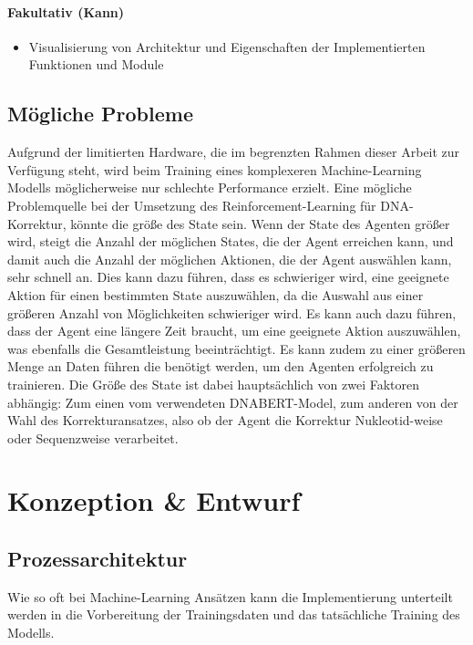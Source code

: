 \documentclass[oneside,bibliography=totocnumbered,BCOR=5mm]{scrbook}%
\theoremstyle{definition}
\theoremstyle{definition}
\theoremstyle{definition}
\theoremstyle{definition}
\theoremstyle{definition}
\theoremstyle{definition}
\begin{document}
\subsubsection{Fakultativ (Kann)}
\begin{itemize}
  \item Visualisierung von Architektur und Eigenschaften der Implementierten Funktionen und Module
  \end{itemize}

\section{Mögliche Probleme}
Aufgrund der limitierten Hardware, die im begrenzten Rahmen dieser Arbeit zur Verfügung steht,
wird beim Training eines komplexeren Machine-Learning Modells möglicherweise nur schlechte Performance erzielt.
Eine mögliche Problemquelle bei der Umsetzung des Reinforcement-Learning für DNA-Korrektur, 
könnte die größe des State sein. 
Wenn der State des Agenten größer wird, steigt die Anzahl der möglichen States, 
die der Agent erreichen kann, und damit auch die Anzahl der möglichen Aktionen, 
die der Agent auswählen kann, sehr schnell an. 
Dies kann dazu führen, dass es schwieriger wird, eine geeignete Aktion für einen bestimmten State auszuwählen, 
da die Auswahl aus einer größeren Anzahl von Möglichkeiten schwieriger wird. 
Es kann auch dazu führen, dass der Agent eine längere Zeit braucht, um eine geeignete Aktion auszuwählen, 
was ebenfalls die Gesamtleistung beeinträchtigt.
Es kann zudem zu einer größeren Menge an Daten führen die benötigt werden, um den Agenten erfolgreich zu trainieren.
Die Größe des State ist dabei hauptsächlich von zwei Faktoren abhängig:
Zum einen vom verwendeten DNABERT-Model, zum anderen von der Wahl des Korrekturansatzes, also
ob der Agent die Korrektur Nukleotid-weise oder Sequenzweise verarbeitet.


\chapter{Konzeption \& Entwurf}
\section{Prozessarchitektur}

Wie so oft bei Machine-Learning Ansätzen kann die Implementierung unterteilt werden in
die Vorbereitung der Trainingsdaten und das tatsächliche Training des Modells. \\
\end{document}
